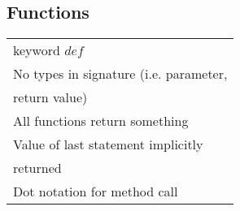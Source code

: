 \subsection*{Functions}
\begin{tabular}{ l }
keyword $def$ \\
\rowcolor{Gray}
No types in signature (i.e. parameter, \\
\rowcolor{Gray}
return value) \\
All functions return something \\
\rowcolor{Gray}
Value of last statement implicitly \\
\rowcolor{Gray}
returned \\
Dot notation for method call \\
\end{tabular}
\\